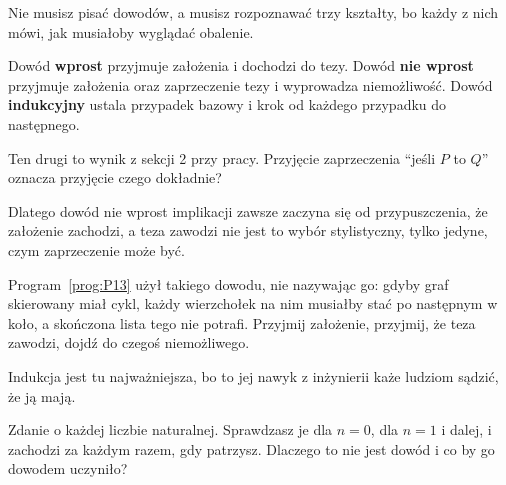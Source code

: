 \begin{fr}
Nie musisz pisać dowodów, a musisz rozpoznawać trzy kształty, bo każdy z nich
mówi, jak musiałoby wyglądać obalenie.

Dowód \textbf{wprost} przyjmuje założenia i dochodzi do tezy. Dowód
\textbf{nie wprost} przyjmuje założenia oraz zaprzeczenie tezy i wyprowadza
niemożliwość. Dowód \textbf{indukcyjny} ustala przypadek bazowy i krok od
każdego przypadku do następnego.

Ten drugi to wynik z sekcji 2 przy pracy. Przyjęcie zaprzeczenia
\enquote{jeśli $P$ to $Q$} oznacza przyjęcie czego dokładnie?
\nextframe
\end{fr}

\begin{fr}
Dlatego dowód nie wprost implikacji zawsze zaczyna się od przypuszczenia, że
założenie zachodzi, a teza zawodzi \dash{} nie jest to wybór stylistyczny,
tylko jedyne, czym zaprzeczenie może być.

Program~\ref{prog:P13} użył takiego dowodu, nie nazywając go: gdyby graf
skierowany miał cykl, każdy wierzchołek na nim musiałby stać po następnym w
koło, a skończona lista tego nie potrafi. Przyjmij założenie, przyjmij, że
teza zawodzi, dojdź do czegoś niemożliwego.
\end{fr}

\begin{fr}
Indukcja jest tu najważniejsza, bo to jej nawyk z inżynierii każe ludziom
sądzić, że ją mają.

Zdanie o każdej liczbie naturalnej. Sprawdzasz je dla $n = 0$, dla $n = 1$ i
dalej, i zachodzi za każdym razem, gdy patrzysz. Dlaczego to nie jest dowód i
co by go dowodem uczyniło?
\dotline
\nextframe
\end{fr}

